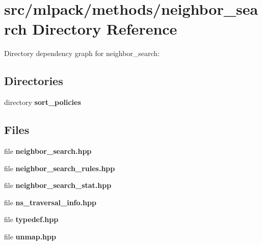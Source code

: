 \section{src/mlpack/methods/neighbor\-\_\-search Directory Reference}
\label{dir_b1fd5cef51dc63e208dea419d88d4471}
Directory dependency graph for neighbor\-\_\-search\-:
\subsection*{Directories}
\begin{DoxyCompactItemize}
\item 
directory {\bf sort\-\_\-policies}
\end{DoxyCompactItemize}
\subsection*{Files}
\begin{DoxyCompactItemize}
\item 
file {\bf neighbor\-\_\-search.\-hpp}
\item 
file {\bf neighbor\-\_\-search\-\_\-rules.\-hpp}
\item 
file {\bf neighbor\-\_\-search\-\_\-stat.\-hpp}
\item 
file {\bf ns\-\_\-traversal\-\_\-info.\-hpp}
\item 
file {\bf typedef.\-hpp}
\item 
file {\bf unmap.\-hpp}
\end{DoxyCompactItemize}

